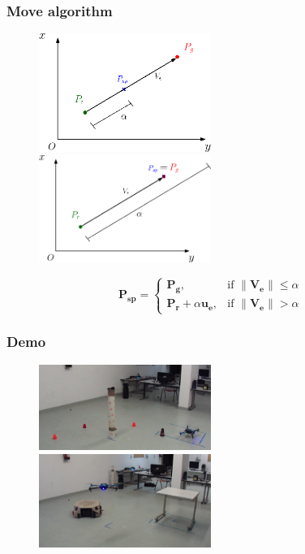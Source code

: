 \documentclass[xcolor=dvipsnames]{beamer}
\begin{document}
\begin{frame}
\frametitle{Move algorithm}
\begin{figure}
\includegraphics[width = 0.5\textwidth]{f/move1.eps}
\includegraphics[width = 0.5\textwidth]{f/move2.eps}
\end{figure}
\begin{equation*}
\boldsymbol{P_{sp}} = 
\begin{cases}
    \boldsymbol{P_g}, & \text{if } \lVert\boldsymbol{V_e} \rVert \leq \alpha \\
    \boldsymbol{P_r} + \alpha \boldsymbol{u_e},&    \text{if } \lVert\boldsymbol{V_e}\rVert > \alpha
\end{cases}
\end{equation*}
\end{frame}

\begin{frame}
\frametitle{Demo}
\begin{figure}
\includegraphics[width = 0.5\textwidth]{f/circle.png}
\includegraphics[width = 0.5\textwidth]{f/multiland.png}

\end{figure}
\end{frame}
\end{document}
